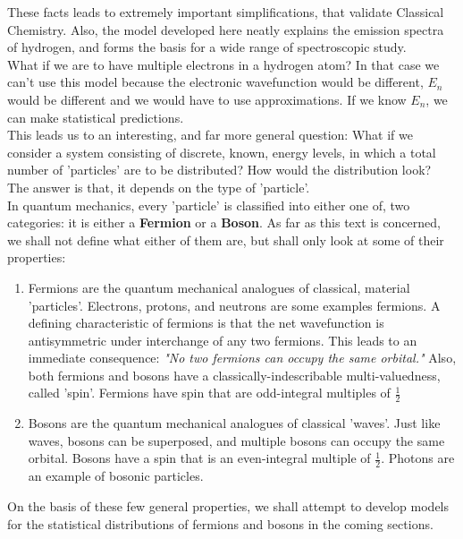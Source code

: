 \documentclass[oneside]{book}
\begin{document}
These facts leads to extremely important simplifications, that validate Classical Chemistry. Also, the model developed here neatly explains the emission spectra of hydrogen, and forms the basis for a wide range of spectroscopic study.\\

What if we are to have multiple electrons in a hydrogen atom? In that case we can't use this model because the electronic wavefunction would be different, $E_n$ would be different and we would have to use approximations. If we know $E_n$, we can make statistical predictions.\\

This leads us to an interesting, and far more general question: What if we consider a system consisting of discrete, known, energy levels, in which a total number of 'particles' are to be distributed? How would the distribution look?\\

The answer is that, it depends on the type of 'particle'.\\

In quantum mechanics, every 'particle' is classified into either one of, two categories: it is either a \textbf{Fermion} or a \textbf{Boson}. As far as this text is concerned, we shall not define what either of them are, but shall only look at some of their properties:

\begin{enumerate}
\item Fermions are the quantum mechanical analogues of classical, material 'particles'. Electrons, protons, and neutrons are some examples fermions. A defining characteristic of fermions is that the net wavefunction is antisymmetric under interchange of any two fermions. This leads to an immediate consequence: \emph{"No two fermions can occupy the same orbital."} Also, both fermions and bosons have a classically-indescribable multi-valuedness, called 'spin'. Fermions have spin that are odd-integral multiples of $\frac{1}{2}$
\item Bosons are the quantum mechanical analogues of classical 'waves'. Just like waves, bosons can be superposed, and multiple bosons can occupy the same orbital. Bosons have a spin that is an even-integral multiple of $\frac{1}{2}$. Photons are an example of bosonic particles. 
\end{enumerate}

On the basis of these few general properties, we shall attempt to develop models for the statistical distributions of fermions and bosons in the coming sections.
\end{document}
